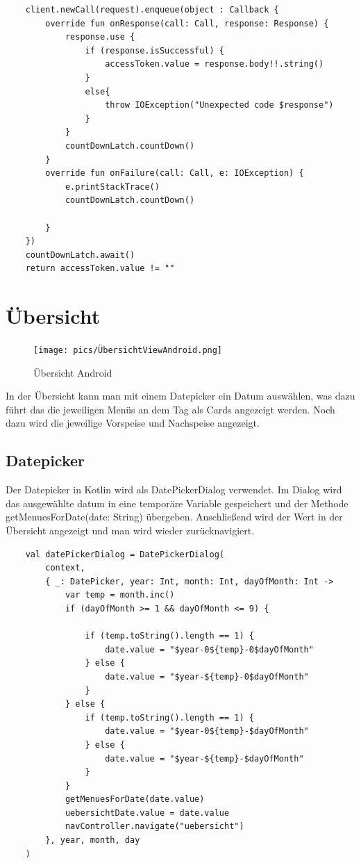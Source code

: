 \begin{lstlisting}
    client.newCall(request).enqueue(object : Callback {
        override fun onResponse(call: Call, response: Response) {
            response.use {
                if (response.isSuccessful) {
                    accessToken.value = response.body!!.string()
                }
                else{
                    throw IOException("Unexpected code $response")
                }
            }
            countDownLatch.countDown()
        }
        override fun onFailure(call: Call, e: IOException) {
            e.printStackTrace()
            countDownLatch.countDown()

        }
    })
    countDownLatch.await()
    return accessToken.value != ""
\end{lstlisting}


\pagebreak
\section{Übersicht}
\begin{figure}[htp]
    \centering
    \author{Bozidar Spasenovic}
    \texttt{[image: pics/ÜbersichtViewAndroid.png]}
    \caption{Übersicht Android}
    \label{fig:impl:ÜbersichtViewAndroid}
\end{figure}

In der Übersicht kann man mit einem Datepicker ein Datum auswählen, was dazu führt das die jeweiligen Menüs an dem Tag 
als Cards angezeigt werden. Noch dazu wird die jeweilige Vorspeise und Nachspeise angezeigt.

\subsection{Datepicker}
Der Datepicker in Kotlin wird als DatePickerDialog verwendet. Im Dialog wird das ausgewählte datum in eine temporäre Variable gespeichert
und der Methode getMenuesForDate(date: String) übergeben. Anschließend wird der Wert in der Übersicht angezeigt und man wird wieder zurücknavigiert.

\begin{lstlisting}
    val datePickerDialog = DatePickerDialog(
        context,
        { _: DatePicker, year: Int, month: Int, dayOfMonth: Int ->
            var temp = month.inc()
            if (dayOfMonth >= 1 && dayOfMonth <= 9) {

                if (temp.toString().length == 1) {
                    date.value = "$year-0${temp}-0$dayOfMonth"
                } else {
                    date.value = "$year-${temp}-0$dayOfMonth"
                }
            } else {
                if (temp.toString().length == 1) {
                    date.value = "$year-0${temp}-$dayOfMonth"
                } else {
                    date.value = "$year-${temp}-$dayOfMonth"
                }
            }
            getMenuesForDate(date.value)
            uebersichtDate.value = date.value
            navController.navigate("uebersicht")
        }, year, month, day
    )
\end{lstlisting}


